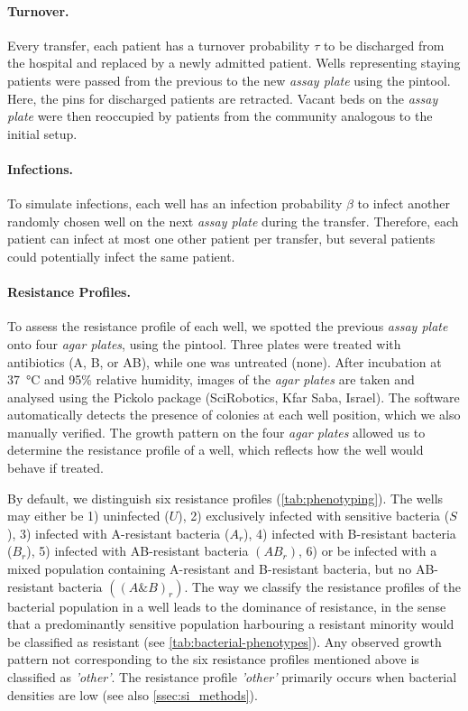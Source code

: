 \paragraph{Turnover.}
Every transfer, each patient has a turnover probability $\tau$ to be discharged from the hospital and replaced by a newly admitted patient.
Wells representing staying patients were passed from the previous to the new \textit{assay plate} using the pintool.
Here, the pins for discharged patients are retracted.
Vacant beds on the \textit{assay plate} were then reoccupied by patients from the community analogous to the initial setup.

\paragraph{Infections.}
To simulate infections, each well has an infection probability $\beta$ to infect another randomly chosen well on the next \textit{assay plate} during the transfer.
Therefore, each patient can infect at most one other patient per transfer, but several patients could potentially infect the same patient.

\paragraph{Resistance Profiles.\label{par:phenotyping}}
To assess the resistance profile of each well, we spotted the previous \textit{assay plate} onto four \textit{agar plates}, using the pintool.
Three plates were treated with antibiotics (A, B, or AB), while one was untreated (none).
After incubation at \SI{37}{\celsius} and 95\% relative humidity, images of the \textit{agar plates} are taken and analysed using the Pickolo package (SciRobotics, Kfar Saba, Israel).
The software automatically detects the presence of colonies at each well position, which we also manually verified.
The growth pattern on the four \textit{agar plates} allowed us to determine the resistance profile of a well, which reflects how the well would behave if treated.

By default, we distinguish six resistance profiles (\autoref{tab:phenotyping}).
The wells may either be 1) uninfected ($U$), 2) exclusively infected with sensitive bacteria ($S$),  3) infected with A-resistant bacteria ($A_r$), 4) infected with B-resistant bacteria ($B_r$), 5) infected with AB-resistant bacteria $(AB_r)$, 6) or be infected with a mixed population containing A-resistant and B-resistant bacteria, but no AB-resistant bacteria $((A\&B)_r)$.
The way we classify the resistance profiles of the bacterial population in a well leads to the dominance of resistance, in the sense that a predominantly sensitive population harbouring a resistant minority would be classified as resistant (see \autoref{tab:bacterial-phenotypes}).
Any observed growth pattern not corresponding to the six resistance profiles mentioned above is classified as \textit{'other'}.
The resistance profile \textit{'other'} primarily occurs when bacterial densities are low (see also \autoref{ssec:si_methods}).

